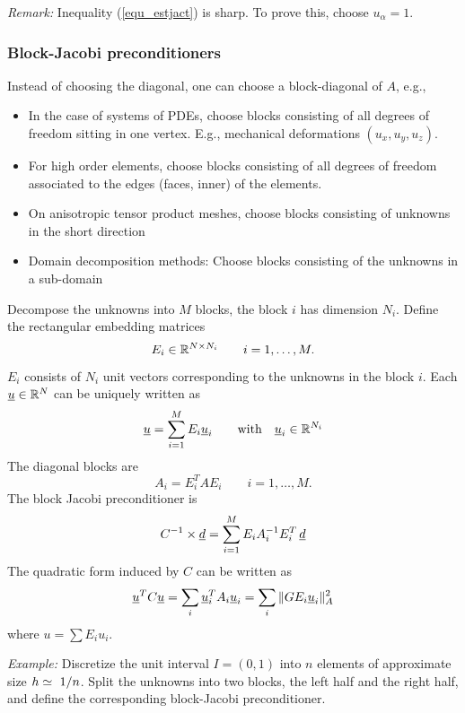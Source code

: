{\em Remark:} Inequality (\ref{equ_estjact}) is sharp. To prove this,
choose $u_\alpha = 1$. 

\subsubsection{Block-Jacobi preconditioners}

Instead of choosing the diagonal, one can choose a block-diagonal of $A$, e.g.,
\begin{itemize}
\item In the  case of systems of PDEs, choose blocks consisting of all 
degrees of freedom sitting in one vertex. E.g., mechanical deformations
$(u_x, u_y, u_z)$.
\item For high order elements, choose blocks consisting of all degrees of 
freedom associated to the edges (faces, inner) of the elements.
\item On anisotropic tensor product meshes, choose blocks consisting of 
unknowns in the short direction
\item Domain decomposition methods: Choose blocks consisting of the
unknowns in a sub-domain
\end{itemize}

Decompose the unknowns into $M$ blocks, the block $i$ has dimension $N_i$. 
Define the rectangular embedding matrices
$$
E_i \in {\mathbb R}^{N \times N_i} \qquad i = 1, \ldots, M.
$$
$E_i$ consists of $N_i$ unit vectors corresponding to the unknowns in the
block $i$. Each $\underline u \in {\mathbb R}^N$ can be uniquely written as
$$
\underline u = \sum_{i=1}^M E_i \underline u_i \qquad \mbox{with} \quad \underline u_i \in {\mathbb R}^{N_i}
$$
The diagonal blocks are
$$
A_i = E_i^T A E_i \qquad i = 1, \ldots, M.
$$
The block Jacobi preconditioner is
$$
C^{-1} \times \underline d = \sum_{i=1}^M E_i A_i^{-1} E_i^T \, \underline d
$$
%
The quadratic form induced by $C$ can be written as
$$
\underline u^T C \underline u = \sum_i \underline u_i^T A_i \underline u_i = \sum_i \| G E_i \underline u_i \|_A^2
$$
where $u = \sum E_i u_i$.

{\em Example:} Discretize the unit interval $I = (0,1)$ into $n$ elements
of approximate size $h \eqc \ 1/n$. Split the unknowns into two blocks, the left half 
and the right half, and define the corresponding block-Jacobi preconditioner.


